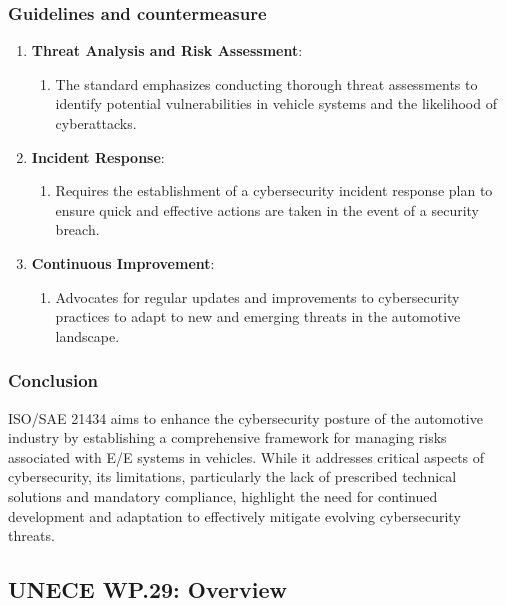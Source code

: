 \subsubsection{Guidelines and countermeasure}\label{subsubsec:guidelines-and-countermeasure}

\begin{enumerate}
    \item \textbf{Threat Analysis and Risk Assessment}:
    \begin{enumerate}
        \item The standard emphasizes conducting thorough threat assessments to identify potential vulnerabilities in vehicle systems and the likelihood of cyberattacks.
    \end{enumerate}

    \item \textbf{Incident Response}:
    \begin{enumerate}
        \item Requires the establishment of a cybersecurity incident response plan to ensure quick and effective actions are taken in the event of a security breach.
    \end{enumerate}

    \item \textbf{Continuous Improvement}:
    \begin{enumerate}
        \item Advocates for regular updates and improvements to cybersecurity practices to adapt to new and emerging threats in the automotive landscape.
    \end{enumerate}
\end{enumerate}

\subsubsection{Conclusion}\label{subsubsec:conclusion}

ISO/SAE 21434 aims to enhance the cybersecurity posture of the automotive industry by establishing a comprehensive framework for managing risks associated with E/E systems in vehicles.
While it addresses critical aspects of cybersecurity, its limitations, particularly the lack of prescribed technical solutions and mandatory compliance, highlight the need for continued development and adaptation to effectively mitigate evolving cybersecurity threats.

\subsection{UNECE WP.29: Overview}\label{subsec:unece-wp-29}

